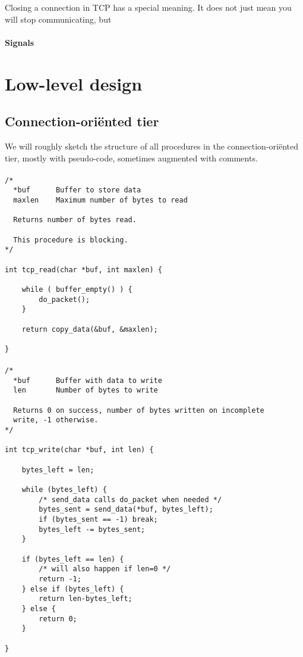 \documentclass[11pt]{article}
\begin{document}
Closing a connection in TCP has a special meaning. It does not just mean you
will stop communicating, but 

\paragraph{Signals}



\section{Low-level design}


\subsection{Connection-ori\"ented tier}


We will roughly sketch the structure of all procedures in the
connection-ori\"ented tier, mostly with pseudo-code, sometimes
augmented with comments.


\paragraph{}


\begin{lstlisting}[title=Procedure tcp\_read]
/*
  *buf      Buffer to store data
  maxlen    Maximum number of bytes to read

  Returns number of bytes read.

  This procedure is blocking.
*/

int tcp_read(char *buf, int maxlen) {

    while ( buffer_empty() ) {
        do_packet();
    }

    return copy_data(&buf, &maxlen);

}
\end{lstlisting}


\paragraph{}


\begin{lstlisting}[title=Procedure tcp\_write]
/*
  *buf      Buffer with data to write
  len       Number of bytes to write

  Returns 0 on success, number of bytes written on incomplete
  write, -1 otherwise.
*/

int tcp_write(char *buf, int len) {

    bytes_left = len;

    while (bytes_left) {
        /* send_data calls do_packet when needed */
        bytes_sent = send_data(*buf, bytes_left);
        if (bytes_sent == -1) break;
        bytes_left -= bytes_sent;
    }

    if (bytes_left == len) {
        /* will also happen if len=0 */
        return -1;
    } else if (bytes_left) {
        return len-bytes_left;
    } else {
        return 0;
    }

}
\end{lstlisting}
\end{document}

